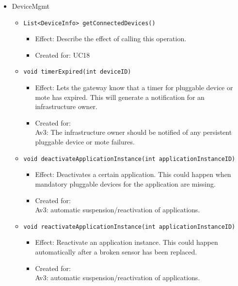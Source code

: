 \begin{itemize}
            \item DeviceMgmt
            \begin{itemize}
                \item \texttt{List<DeviceInfo> getConnectedDevices()}
                \begin{itemize}
                    \item Effect: Describe the effect of calling this operation.
                    \item Created for: UC18
                \end{itemize}
                \item \texttt{void timerExpired(int deviceID)}
                \begin{itemize}
                    \item Effect: Lets the gateway know that a timer for pluggable device or mote has expired.
                                  This will generate a notification for an infrastructure owner.
                    \item Created for: \\
                          Av3: The infrastructure owner should be notified of
                          any persistent pluggable device or mote failures.
                \end{itemize}
                \item \texttt{void deactivateApplicationInstance(int applicationInstanceID)}
                \begin{itemize}
                    \item Effect: Deactivates a certain application. This could happen when
                                  mandatory pluggable devices for the application are missing.
                    \item Created for:\\
                          Av3: automatic suspension/reactivation of applications.
                \end{itemize}
                \item \texttt{void reactivateApplicationInstance(int applicationInstanceID)}
                \begin{itemize}
                    \item Effect: Reactivate an application instance. This could happen
                                  automatically after a broken sensor has been replaced.
                    \item Created for:\\
                          Av3: automatic suspension/reactivation of applications.
                \end{itemize}
            \end{itemize}


\end{itemize}
